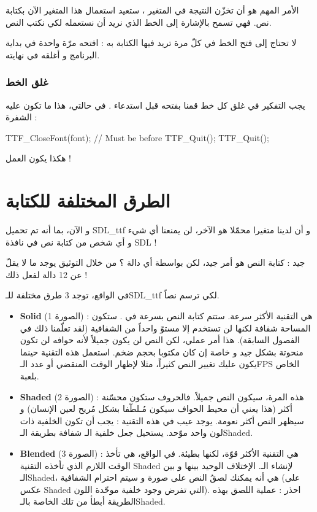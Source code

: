 الأمر المهم هو أن
تخزّن النتيجة في المتغير
،
ستعيد استعمال هذا المتغير الآن بكتابة نص. فهي تسمح بالإشارة إلى الخط الذي نريد أن نستعمله لكي نكتب النص.

\begin{information}
لا تحتاج إلى فتح الخط في كلّ مرة تريد فيها الكتابة به : افتحه مرّة واحدة في بداية البرنامج و أغلقه في نهايته.
\end{information}

\subsubsection{غلق الخط}

يجب التفكير في غلق كل خط قمنا بفتحه قبل استدعاء
.
في حالتي، هذا ما تكون عليه الشفرة :

\begin{Csource}
TTF_CloseFont(font); // Must be before TTF_Quit();
TTF_Quit();
\end{Csource}

هكذا يكون العمل !

\section{الطرق المختلفة للكتابة}

و الآن، بما أنه تم تحميل
\textenglish{SDL\_ttf}
و أن لدينا متغيرا 
محمّلا هو الآخر، لن يمنعنا أي شيء و أي شخص من كتابة نص في نافذة 
\textenglish{SDL} !

جيد : كتابة النص هو أمر جيد، لكن بواسطة أي دالة ؟ من خلال التوثيق يوجد ما لا يقلّ عن 12 دالة لفعل ذلك !

في الواقع، توجد 3 طرق مختلفة للـ\textenglish{SDL\_ttf}
لكي ترسم نصاً.


\begin{itemize}
	\item \textbf{\textenglish{Solid}}
	(الصورة 1) : هي التقنية الأكثر سرعة. ستتم كتابة النص بسرعة في
	.
	ستكون المساحة شفافة لكنها لن تستخدم إلا مستوً واحداً من الشفافية (لقد تعلّمنا ذلك في الفصول السابقة). هذا أمر عملي، لكن النص لن يكون جميلاً لأنه حوافه لن تكون منحوتة بشكل جيد و خاصة إن كان مكتوبا بحجم ضخم. استعمل هذه التقنية حينما يكون عليك تغيير النص كثيراً، مثلا لإظهار الوقت المنقضي أو عدد الـ\textenglish{FPS}
	الخاص بلعبة.
	\item \textbf{\textenglish{Shaded}}
	(الصورة 2) : هذه المرة، سيكون النص جميلاً. فالحروف ستكون محسّنة أكثر (هذا يعني أن محيط الحواف سيكون مُـلطّفا بشكل مُريح لعين الإنسان) و سيظهر النص أكثر نعومة. يوجد عيب في هذه التقنية : يجب أن تكون الخلفية ذات لون واحد موّحد. يستحيل جعل خلفية الـ
	شفافة بطريقة الـ\textenglish{Shaded}.
	\item \textbf{\textenglish{Blended}}
	(الصورة 3) : هي التقنية الأكثر قوّة، لكنها بطيئة. في الواقع، هي تأخذ الوقت اللازم الذي تأخذه التقنية 
	\textenglish{Shaded}
	لإنشاء الـ.
	الإختلاف الوحيد بينها و بين الـ\textenglish{Shaded}،
	هي أنه يمكنك لصقُ النص على صورة و سيتم احترام الشفافية (على عكس
	\textenglish{Shaded}
	التي تفرض وجود خلفية موحّدة اللون). احذر : عملية اللصق بهذه الطريقة أبطأ من تلك الخاصة بالـ\textenglish{Shaded}.
\end{itemize}

